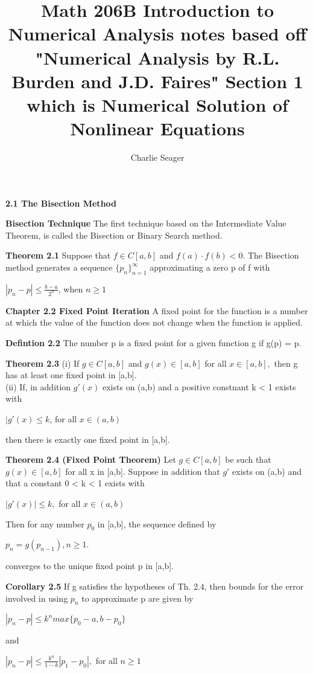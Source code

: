 \documentclass{article}
\begin{document}
\title{Math 206B Introduction to Numerical Analysis notes based off "Numerical Analysis by R.L. Burden and J.D. Faires" Section 1 which is Numerical Solution of Nonlinear Equations}
\author{Charlie Seager}
\maketitle

\textbf{2.1 The Bisection Method}

\textbf {Bisection Technique} The first technique based on the Intermediate Value Theorem, is called the Bisection or Binary Search method.

\textbf {Theorem 2.1} Suppose that $f \in C[a,b]$ and $f(a) \cdot f(b) < 0$. The Bisection method generates a sequence ${\{p_n\}_{n=1}^{\infty}}$ approximating a zero p of f with

\begin{center}
$| p_n - p| \leq \frac{b-a}{2^n}$, when $n \geq 1$
\end{center}

\textbf{Chapter 2.2 Fixed Point Iteration} A fixed point for the function is a number at which the value of the function does not change when the function is applied.

\textbf{Defintion 2.2} The number p is a fixed point for a given function g if g(p) = p.

\textbf{Theorem 2.3} (i) If $g \in C[a,b]$ and $g(x) \in [a,b]$ for all $x \in [a,b],$ then g has at least one fixed point in [a,b].
\\ (ii) If, in addition $g'(x)$ exists on (a,b) and a positive constnant k < 1 exists with 
\begin{center}
$|g'(x) \leq k$, for all $x \in (a,b)$
\end{center}
then there is exactly one fixed point in [a,b].

\textbf {Theorem 2.4 (Fixed Point Theorem)} Let $g \in C[a,b]$ be such that $g(x) \in [a,b]$ for all x in [a,b]. Suppose in addition that $g'$ exists on (a,b) and that a constant 0 < k < 1 exists with
\begin{center}
$|g'(x)| \leq k, $ for all $x \in (a,b)$
\end{center}
Then for any number $p_0$ in [a,b], the sequence defined by
\begin{center}
$p_n = g(p_{n-1}), n \geq 1.$
\end{center}
converges to the unique fixed point p in [a,b].

\textbf {Corollary 2.5} If g satisfies the hypotheses of Th. 2.4, then bounds for the error involved in using $p_n$ to approximate p are given by
\begin{center}
$|p_n - p| \leq k^n max \{p_0 - a,b - p_0\}$
\end{center}
and
\begin{center}
$|p_n - p| \leq \frac{k^n}{1-k} |p_1 - p_0|,$ for all $n \geq 1$
\end{center}
\end{document}
